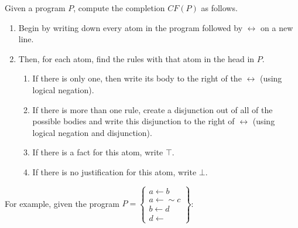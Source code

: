 \documentclass[9pt,a4paper,landscape]{article}
\begin{document}
{Given a program $P$, compute the completion $CF(P)$ as follows.

\begin{enumerate}[noitemsep]
	\item Begin by writing down every atom in the program followed by $\leftrightarrow$ on a new line.
	\item Then, for each atom, find the rules with that atom in the head in $P$.
	\begin{enumerate}[noitemsep]
		\item If there is only one, then write its body to the right of the $\leftrightarrow$ (using logical negation).
		\item If there is more than one rule, create a disjunction out of all of the possible bodies and write this disjunction to the right of $\leftrightarrow$ (using logical negation and disjunction).
		\item If there is a fact for this atom, write $\top$.
		\item If there is no justification for this atom, write $\bot$.
	\end{enumerate}
\end{enumerate}

For example, given the program $P = \left\{\begin{array}{l}
a \leftarrow b \\
a \leftarrow {\sim} c \\
b \leftarrow d\\
d \leftarrow 
\end{array}\right\}$:

}
\end{document}
